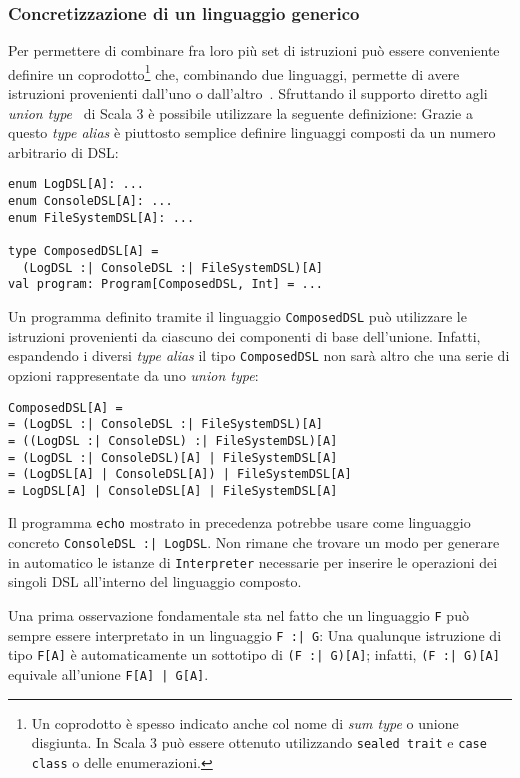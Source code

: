 \subsubsection{Concretizzazione di un linguaggio generico}
Per permettere di combinare fra loro più set di istruzioni può essere conveniente definire un coprodotto\footnote{Un coprodotto è spesso indicato anche col nome di \emph{sum type} o unione disgiunta. In Scala 3 può essere ottenuto utilizzando \lstinline{sealed trait} e \lstinline{case class} o delle enumerazioni.} che, combinando due linguaggi, permette di avere istruzioni provenienti dall'uno o dall'altro~\cite{cit:data-types-a-la-carte}.
Sfruttando il supporto diretto agli \emph{union type}~\cite{cit:scala3-union-types} di Scala 3 è possibile utilizzare la seguente definizione:
Grazie a questo \emph{type alias} è piuttosto semplice definire linguaggi composti da un numero arbitrario di DSL:
\begin{lstlisting}[language=scala3]
enum LogDSL[A]: ... 
enum ConsoleDSL[A]: ...
enum FileSystemDSL[A]: ...

type ComposedDSL[A] =
  (LogDSL :| ConsoleDSL :| FileSystemDSL)[A]
val program: Program[ComposedDSL, Int] = ...
\end{lstlisting}
Un programma definito tramite il linguaggio \lstinline{ComposedDSL} può utilizzare le istruzioni provenienti da ciascuno dei componenti di base dell'unione. Infatti, espandendo i diversi \emph{type alias} il tipo \lstinline{ComposedDSL} non sarà altro che una serie di opzioni rappresentate da uno \emph{union type}:
\begin{lstlisting}
ComposedDSL[A] =
= (LogDSL :| ConsoleDSL :| FileSystemDSL)[A]
= ((LogDSL :| ConsoleDSL) :| FileSystemDSL)[A]
= (LogDSL :| ConsoleDSL)[A] | FileSystemDSL[A]
= (LogDSL[A] | ConsoleDSL[A]) | FileSystemDSL[A]
= LogDSL[A] | ConsoleDSL[A] | FileSystemDSL[A]
\end{lstlisting}

Il programma \lstinline{echo} mostrato in precedenza potrebbe usare come linguaggio concreto \lstinline{ConsoleDSL :| LogDSL}. Non rimane che trovare un modo per generare in automatico le istanze di \lstinline{Interpreter} necessarie per inserire le operazioni dei singoli DSL all'interno del linguaggio composto.

Una prima osservazione fondamentale sta nel fatto che un linguaggio \lstinline{F} può sempre essere interpretato in un linguaggio \lstinline{F :| G}:
Una qualunque istruzione di tipo \lstinline{F[A]} è automaticamente un sottotipo di \lstinline{(F :| G)[A]}; infatti, \lstinline{(F :| G)[A]} equivale all'unione \lstinline{F[A] | G[A]}.

